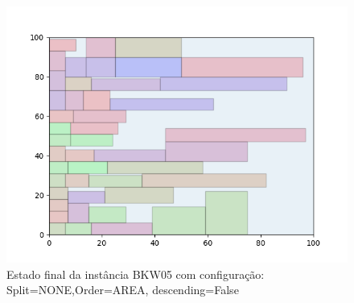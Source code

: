 \begin{figure}[H]
    \centering
    \caption[]{Estado final da instância BKW05 com configuração: Split=NONE,Order=AREA, descending=False}
    \label{fig:bkw05-none-area-false}
    \includegraphics[scale=0.5]{output/figures/bkw/bkw05/none/area/false/00}
\end{figure}